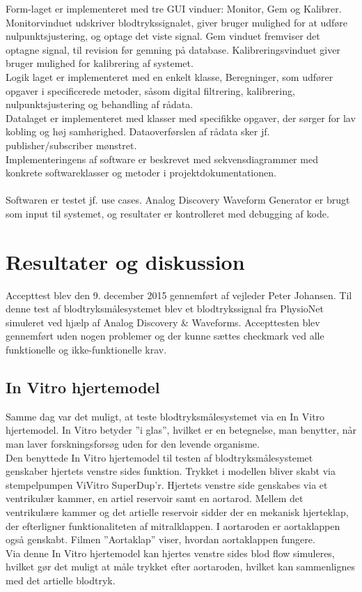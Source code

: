 Form-laget er implementeret med tre GUI vinduer: Monitor, Gem og Kalibrer.\\ 
Monitorvinduet udskriver blodtrykssignalet, giver bruger mulighed for at udføre nulpunktsjustering, og optage det viste signal. Gem vinduet fremviser det optagne signal, til revision før gemning på database. Kalibreringsvinduet giver bruger mulighed for kalibrering af systemet.\\ 
Logik laget er implementeret med en enkelt klasse, Beregninger, som udfører opgaver i specificerede metoder, såsom digital filtrering, kalibrering, nulpunktsjustering og behandling af rådata.\\
Datalaget er implementeret med klasser med specifikke opgaver, der sørger for lav kobling og høj samhørighed. Dataoverførslen af rådata sker jf. publisher/subscriber mønstret. \\
Implementeringens af software er beskrevet med sekvensdiagrammer med konkrete softwareklasser og metoder i projektdokumentationen.
\\\\

Softwaren er testet jf. use cases. Analog Discovery Waveform Generator er brugt som input til systemet, og resultater er kontrolleret med debugging af kode.


\section{Resultater og diskussion}
Accepttest blev den 9. december 2015 gennemført af vejleder Peter Johansen. Til denne test af blodtryksmålesystemet blev et blodtrykssignal fra PhysioNet simuleret ved hjælp af Analog Discovery \& Waveforms. Accepttesten blev gennemført uden nogen problemer og der kunne sættes checkmark ved alle funktionelle og ikke-funktionelle krav. 

\subsection{In Vitro hjertemodel}
Samme dag var det muligt, at teste blodtryksmålesystemet via en In Vitro hjertemodel. In Vitro betyder ”i glas”, hvilket er en betegnelse, man benytter, når man laver forskningsforsøg uden for den levende organisme. \\
Den benyttede In Vitro hjertemodel til testen af blodtryksmålesystemet genskaber hjertets venstre sides funktion. Trykket i modellen bliver skabt via stempelpumpen ViVitro SuperDup'r. Hjertets venstre side genskabes via et ventrikulær kammer, en artiel reservoir samt en aortarod. Mellem det ventrikulære kammer og det artielle reservoir sidder der en mekanisk hjerteklap, der efterligner funktionaliteten af mitralklappen. I aortaroden er aortaklappen også genskabt. Filmen ”Aortaklap” viser, hvordan aortaklappen fungere.\\
Via denne In Vitro hjertemodel kan hjertes venstre sides blod flow simuleres, hvilket gør det muligt at måle trykket efter aortaroden, hvilket kan sammenlignes med det artielle blodtryk.

